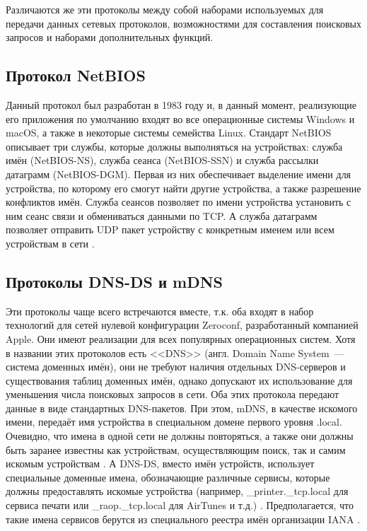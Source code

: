 
Различаются же эти протоколы между собой наборами используемых для передачи данных сетевых протоколов, возможностями для составления поисковых запросов и наборами дополнительных функций.

\subsection{Протокол NetBIOS}
Данный протокол был разработан в 1983 году и, в данный момент, реализующие его приложения по умолчанию входят во все операционные системы Windows и macOS, а также в некоторые системы семейства Linux.
Стандарт NetBIOS описывает три службы, которые должны выполняться на устройствах: служба имён (NetBIOS-NS), служба сеанса (NetBIOS-SSN) и служба рассылки датаграмм (NetBIOS-DGM).
Первая из них обеспечивает выделение имени для устройства, по которому его смогут найти другие устройства, а также разрешение конфликтов имён.
Служба сеансов позволяет по имени устройства установить с ним сеанс связи и обмениваться данными по TCP.
А служба датаграмм позволяет отправить UDP пакет устройству с конкретным именем или всем устройствам в сети \cite{web:netbios}.

\subsection{Протоколы DNS-DS и mDNS}
Эти протоколы чаще всего встречаются вместе, т.к. оба входят в набор технологий для сетей нулевой конфигурации Zeroconf, разработанный компанией Apple.
Они имеют реализации для всех популярных операционных систем.
Хотя в названии этих протоколов есть <<DNS>> (англ. Domain Name System~--- система доменных имён), они не требуют наличия отдельных DNS-серверов и существования таблиц доменных имён, однако допускают их использование для уменьшения числа поисковых запросов в сети.
Оба этих протокола передают данные в виде стандартных DNS-пакетов.
При этом, mDNS, в качестве искомого имени, передаёт имя устройства в специальном домене первого уровня .local.
Очевидно, что имена в одной сети не должны повторяться, а также они должны быть заранее известны как устройствам, осуществляющим поиск, так и самим искомым устройствам \cite{web:dns-ds,web:mdns}.
А DNS-DS, вместо имён устройств, использует специальные доменные имена, обозначающие различные сервисы, которые должны предоставлять искомые устройства (например, {\_}printer.{\_}tcp.local для сервиса печати или {\_}raop.{\_}tcp.local для AirTunes и т.д.) \cite{web:dns-ds, book:zero-conf-guide}.
Предполагается, что такие имена сервисов берутся из специального реестра имён организации IANA \cite{web:iana-dns-ds}.

